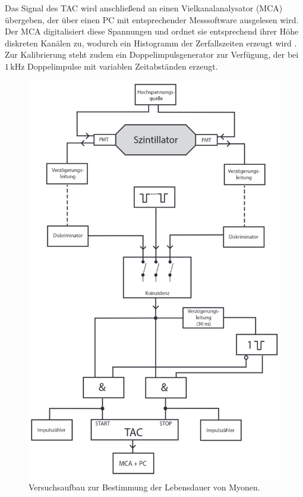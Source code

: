 Das Signal des TAC wird anschließend an einen Vielkanalanalysator (MCA) übergeben, der über einen PC mit entsprechender Messsoftware ausgelesen wird. Der MCA digitalisiert diese Spannungen und 
ordnet sie entsprechend ihrer Höhe diskreten Kanälen zu, wodurch ein Histogramm der Zerfallszeiten erzeugt wird \cite{Teilchendetektoren}. Zur Kalibrierung steht zudem ein Doppelimpulsgenerator zur Verfügung, 
der bei $1\,\unit{\kilo\hertz}$ Doppelimpulse mit variablen Zeitabständen erzeugt.
\begin{figure}[H]
    \centering
    \includegraphics[width = 0.6\linewidth]{bilder/AufbauV01.png}
    \caption{Versuchsaufbau zur Bestimmung der Lebensdauer von Myonen. \cite{anleitungV01}}
    \label{AufbauV01}
\end{figure}
